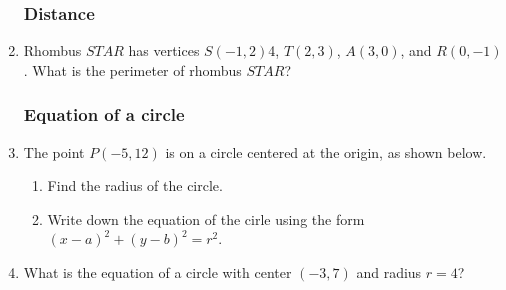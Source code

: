\documentclass[12pt, twoside]{article}
\begin{document}
\begin{enumerate}
\subsubsection*{Distance}

  \item Rhombus $STAR$ has vertices $S(-1,2)$4, $T(2,3)$, $A(3,0)$, and $R(0,-1)$. What is the perimeter of rhombus $STAR$?

\subsubsection*{Equation of a circle}
  \item The point $P(-5,12)$ is on a circle centered at the origin, as shown below.
  \begin{multicols}{2}
    \raggedcolumns
    \begin{enumerate}
      \item Find the radius of the circle. \vspace{3cm}
      \item Write down the equation of the cirle using the form $(x-a)^2+(y-b)^2=r^2$.
    \end{enumerate}
  \end{multicols}

  \item What is the equation of a circle with center $(-3,7)$ and radius $r=4$?\vspace{1.5cm}


\end{enumerate}
\end{document}

